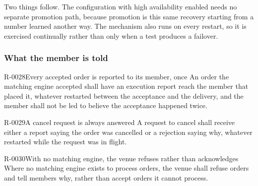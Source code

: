 Two things follow. The configuration with high availability enabled needs no
separate promotion path, because promotion is this same recovery starting from a
number learned another way. The mechanism also runs on every restart, so it is
exercised continually rather than only when a test produces a failover.


\subsubsection{What the member is told}
\label{sec:ha:disabled:me:member}

\begin{requirement}{R-0028}{Every accepted order is reported to its member, once}
  An order the matching engine accepted shall have an execution report reach the
  member that placed it, whatever restarted between the acceptance and the
  delivery, and the member shall not be led to believe the acceptance happened
  twice.
\end{requirement}

\begin{requirement}{R-0029}{A cancel request is always answered}
  A request to cancel shall receive either a report saying the order was
  cancelled or a rejection saying why, whatever restarted while the request was
  in flight.
\end{requirement}

\begin{requirement}{R-0030}{With no matching engine, the venue refuses rather than acknowledges}
  Where no matching engine exists to process orders, the venue shall refuse
  orders and tell members why, rather than accept orders it cannot process.
\end{requirement}

